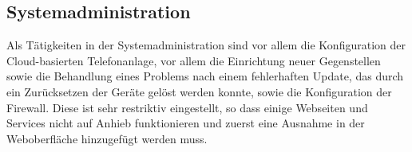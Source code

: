 \subsection{Systemadministration}
Als Tätigkeiten in der Systemadministration sind vor allem die Konfiguration der Cloud-basierten Telefonanlage, vor allem die Einrichtung neuer Gegenstellen
sowie die Behandlung eines Problems nach einem fehlerhaften Update, das durch ein Zurücksetzen der Geräte gelöst werden konnte, sowie die Konfiguration
der Firewall. Diese ist sehr restriktiv eingestellt, so dass einige Webseiten und Services nicht auf Anhieb funktionieren und zuerst eine Ausnahme 
in der Weboberfläche hinzugefügt werden muss.




